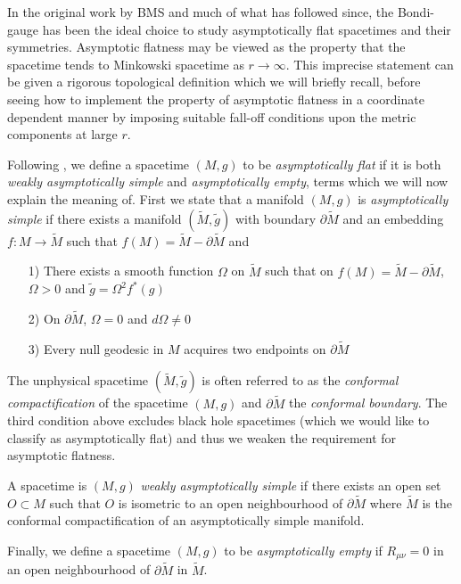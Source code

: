\documentclass[a4paper,11pt]{article}
\numberwithin{equation}{section}
\begin{document}
In the original work by BMS and much of what has followed since, the Bondi-gauge has been the ideal choice to study asymptotically flat spacetimes and their symmetries. Asymptotic flatness may be viewed as the property that the spacetime tends to Minkowski spacetime as $r \rightarrow \infty$. This imprecise statement can be given a rigorous topological definition \cite{Wald:1984rg, Hawking:1973uf} which we will briefly recall, before seeing how to implement the property of asymptotic flatness in a coordinate dependent manner by imposing suitable fall-off conditions upon the metric components at large $r$. 

Following \cite{Townsend:1997ku, Hawking:1973uf}, we define a spacetime $(M, g)$ to be \textit{asymptotically flat} if it is both \textit{weakly asymptotically simple} and \textit{asymptotically empty}, terms which we will now explain the meaning of. First we state that a manifold $(M, g)$ is \textit{asymptotically simple} if there exists a manifold $(\tilde{M}, \tilde{g})$ with boundary $\partial \tilde{M}$ and an embedding $f: M \rightarrow \tilde{M}$ such that $f(M)= \tilde{M} - \partial \tilde{M}$ and

\begin{itemize}
\item[1)] There exists a smooth function $\Omega$ on $\tilde{M}$ such that on $f(M)= \tilde{M} - \partial \tilde{M}$, $\Omega > 0$ and $\tilde{g} = \Omega^2 f^*(g)$
\item[2)] On $\partial \tilde{M}$, $\Omega=0$ and $d \Omega \neq 0$
\item[3)] Every null geodesic in $M$ acquires two endpoints on $\partial \tilde{M}$
\end{itemize}

\noindent The unphysical spacetime $(\tilde{M}, \tilde{g})$ is often referred to as the \textit{conformal compactification} of the spacetime $(M, g)$ and $\partial \tilde{M}$ the \textit{conformal boundary}. The third condition above excludes black hole spacetimes (which we would like to classify as asymptotically flat) and thus we weaken the requirement for asymptotic flatness. 

A spacetime is $(M,g)$ \textit{weakly asymptotically simple} if there exists an open set $O \subset M$ such that $O$ is isometric to an open neighbourhood of $\partial \tilde{M}$ where $\tilde{M}$ is the conformal compactification of an asymptotically simple manifold. 

Finally, we define a spacetime $(M, g)$ to be \textit{asymptotically empty} if $R_{\mu \nu}=0$ in an open neighbourhood of $\partial \tilde{M}$ in $\tilde{M}$.  
\end{document}
